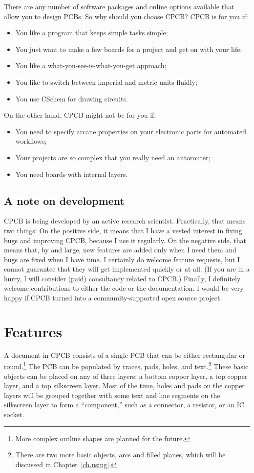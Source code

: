 \documentclass[11pt]{report}
\begin{document}
There are any number of software packages and online options available
that allow you to design PCBs. So why should you choose CPCB? CPCB is
for you if:
\begin{itemize}
\item You like a program that keeps simple tasks simple;
\item You just want to make a few boards for a project and get on
  with your life;
\item You like a what-you-see-is-what-you-get approach;
\item You like to switch between imperial and metric units fluidly;
\item You use CSchem for drawing circuits.        
\end{itemize}
%
On the other hand, CPCB might not be for you if:
\begin{itemize}
  \item You need to specify arcane properties on
  your electronic parts for automated workflows;
\item Your projects are so complex that you really need an
  autorouter;
\item You need boards with internal layers.
\end{itemize}
%
\subsection{A note on development}
CPCB is being developed by an
active research scientist. Practically, that means two things: On the
positive side, it means that I have a vested interest in fixing bugs
and improving CPCB, because I use it regularly. On the negative side, that
means that, by and large, new features are added only when I need them
and bugs are fixed when I have time. I certainly do welcome feature
requests, but I cannot guarantee that they will get implemented
quickly or at all. (If you are in a hurry, I will consider (paid)
consultancy related to CPCB.) Finally, I definitely welcome
contributions to either the code or the documentation. I would be very
happy if CPCB turned into a community-supported open source project.

\section{Features}

A document in CPCB consists of a single PCB that can be either
rectangular or round.\footnote{More complex outline shapes are planned
  for the future.} The PCB can be populated by traces, pads, holes,
and text.\footnote{There are two more basic objects, arcs and filled
  planes, which will be discussed in  Chapter~\ref{ch.using}.} These basic
objects can be placed on any of three layers: a bottom copper layer, a
top copper layer, and a top silkscreen layer. Most of the time, holes
and pads on the copper layers will be grouped together with some text
and line segments on the silkscreen layer to form a ``component,''
such as a connector, a resistor, or an IC socket.
\end{document}
